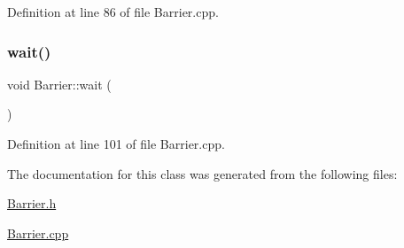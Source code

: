 Definition at line 86 of file Barrier.\+cpp.

\mbox{\label{class_barrier_a83a9d2e85e98b3d2081538bf0da29b60}} 
\subsubsection{\texorpdfstring{wait()}{wait()}}
{\footnotesize\ttfamily void Barrier\+::wait (\begin{DoxyParamCaption}{ }\end{DoxyParamCaption})}



Definition at line 101 of file Barrier.\+cpp.



The documentation for this class was generated from the following files\+:\begin{DoxyCompactItemize}
\item 
\hyperlink{_barrier_8h}{Barrier.\+h}\item 
\hyperlink{_barrier_8cpp}{Barrier.\+cpp}\end{DoxyCompactItemize}
